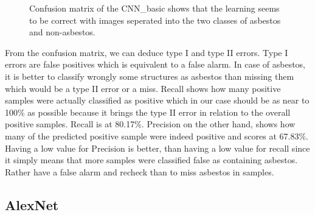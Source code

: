 \begin{figure}[!h]
\centering
\caption{Confusion matrix of the CNN\_basic shows that the learning seems to be correct with images seperated into the two classes of asbestos and non-asbestos.}
\label{fig:cnn-basic-cm}
\end{figure}

\quad

From the confusion matrix, we can deduce type I and type II errors. Type I errors are false positives which is equivalent to a false alarm. In case of asbestos, it is better to classify wrongly some structures as asbestos than missing them which would be a type II error or a miss. Recall shows how many positive samples were actually classified as positive which in our case should be as near to 100\% as possible because it brings the type II error in relation to the overall positive samples. Recall is at 80.17\%. Precision on the other hand, shows how many of the predicted positive sample were indeed positive and scores at 67.83\%. Having a low value for Precision is better, than having a low value for recall since it simply means that more samples were classified false as containing asbestos. Rather have a false alarm and recheck than to miss asbestos in samples. \\















\subsection{AlexNet}

